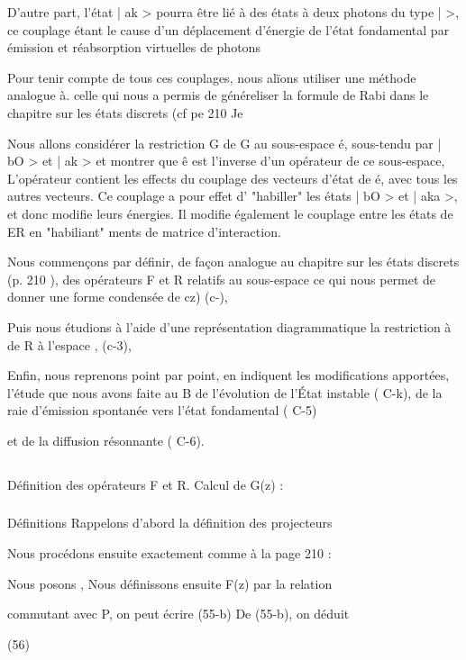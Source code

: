 D'autre part, l'état | ak > pourra être lié à des états à deux
photons du type |  >, ce couplage étant le cause d'un déplacement
d'énergie de l'état fondamental par émission et réabsorption virtuelles de
photons

Pour tenir compte de tous ces couplages, nous alïons utiliser
une méthode analogue à. celle qui nous a permis de généreliser la formule de
Rabi dans le chapitre sur les états discrets (cf pe 210 Je

Nous allons considérer la restriction G de G au sous-espace é,
sous-tendu par | bO > et | ak > et montrer que ê est l'inverse d'un opérateur
de ce sous-espace,  L'opérateur  contient les effects du couplage
des vecteurs d'état de é, avec tous les autres vecteurs. Ce couplage a pour
effet d' "habiller" les états | bO > et | aka >, et donc modifie leurs énergies.
Il modifie également le couplage entre les états de ER en "habiliant" 
ments de matrice d'interaction.

Nous commençons par définir, de façon analogue au chapitre sur
les états discrets (p. 210 ), des opérateurs F et R relatifs au sous-espace 
ce qui nous permet de donner une forme condensée de cz) (c-),

Puis nous étudions à l'aide d'une représentation diagrammatique
la restriction à de R à l'espace , (c-3),

Enfin, nous reprenons point par point, en indiquent les modifications apportées, l'étude que nous avons faite au  B de l'évolution de l'État instable ( C-k), de la raie d'émission spontanée vers l'état fondamental ( C-5)

et de la diffusion résonnante ( C-6).


\subsection{} Définition des opérateurs F et R. Calcul de G(z) :%
\subsubsection{} Définitions Rappelons d'abord la définition des projecteurs%

Nous procédons ensuite exactement comme à la page 210 :

Nous posons
,
Nous définissons ensuite F(z) par la relation

commutant avec P, on peut écrire
(55-b)
De (55-b), on déduit

(56)

